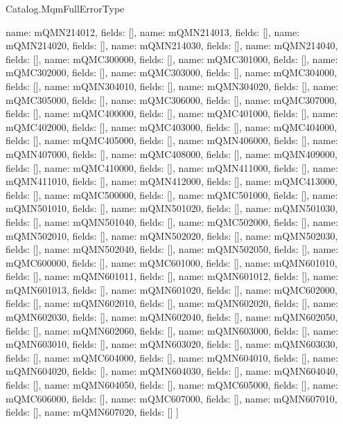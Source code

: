 \begin{lexlean}{Catalog.MqmFullErrorType}
\begin{semanticmodule}
{    {name: mQMN214012, fields: []},
    {name: mQMN214013, fields: []},
    {name: mQMN214020, fields: []},
    {name: mQMN214030, fields: []},
    {name: mQMN214040, fields: []},
    {name: mQMC300000, fields: []},
    {name: mQMC301000, fields: []},
    {name: mQMC302000, fields: []},
    {name: mQMC303000, fields: []},
    {name: mQMC304000, fields: []},
    {name: mQMN304010, fields: []},
    {name: mQMN304020, fields: []},
    {name: mQMC305000, fields: []},
    {name: mQMC306000, fields: []},
    {name: mQMC307000, fields: []},
    {name: mQMC400000, fields: []},
    {name: mQMC401000, fields: []},
    {name: mQMC402000, fields: []},
    {name: mQMC403000, fields: []},
    {name: mQMC404000, fields: []},
    {name: mQMC405000, fields: []},
    {name: mQMN406000, fields: []},
    {name: mQMN407000, fields: []},
    {name: mQMC408000, fields: []},
    {name: mQMN409000, fields: []},
    {name: mQMC410000, fields: []},
    {name: mQMN411000, fields: []},
    {name: mQMN411010, fields: []},
    {name: mQMN412000, fields: []},
    {name: mQMC413000, fields: []},
    {name: mQMC500000, fields: []},
    {name: mQMC501000, fields: []},
    {name: mQMN501010, fields: []},
    {name: mQMN501020, fields: []},
    {name: mQMN501030, fields: []},
    {name: mQMN501040, fields: []},
    {name: mQMC502000, fields: []},
    {name: mQMN502010, fields: []},
    {name: mQMN502020, fields: []},
    {name: mQMN502030, fields: []},
    {name: mQMN502040, fields: []},
    {name: mQMN502050, fields: []},
    {name: mQMC600000, fields: []},
    {name: mQMC601000, fields: []},
    {name: mQMN601010, fields: []},
    {name: mQMN601011, fields: []},
    {name: mQMN601012, fields: []},
    {name: mQMN601013, fields: []},
    {name: mQMN601020, fields: []},
    {name: mQMC602000, fields: []},
    {name: mQMN602010, fields: []},
    {name: mQMN602020, fields: []},
    {name: mQMN602030, fields: []},
    {name: mQMN602040, fields: []},
    {name: mQMN602050, fields: []},
    {name: mQMN602060, fields: []},
    {name: mQMN603000, fields: []},
    {name: mQMN603010, fields: []},
    {name: mQMN603020, fields: []},
    {name: mQMN603030, fields: []},
    {name: mQMC604000, fields: []},
    {name: mQMN604010, fields: []},
    {name: mQMN604020, fields: []},
    {name: mQMN604030, fields: []},
    {name: mQMN604040, fields: []},
    {name: mQMN604050, fields: []},
    {name: mQMC605000, fields: []},
    {name: mQMC606000, fields: []},
    {name: mQMC607000, fields: []},
    {name: mQMN607010, fields: []},
    {name: mQMN607020, fields: []}
  ]
}


\end{semanticmodule}
\end{lexlean}
